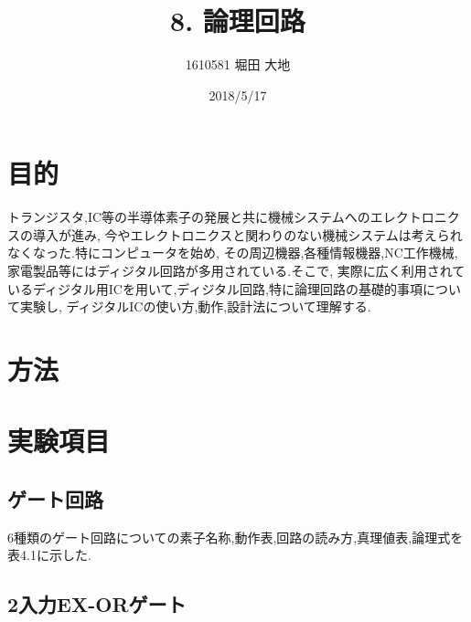 \documentclass[twocolumn, 10pt,a4j]{jsarticle}
\title{\vspace{-2.5cm}8. 論理回路}
\author{1610581 堀田 大地}
\date{2018/5/17}
\begin{document}
\maketitle{}
\section{目的}
トランジスタ,IC等の半導体素子の発展と共に機械システムへのエレクトロニクスの導入が進み,
今やエレクトロニクスと関わりのない機械システムは考えられなくなった.特にコンピュータを始め,
その周辺機器,各種情報機器,NC工作機械, 家電製品等にはディジタル回路が多用されている.そこで,
実際に広く利用されているディジタル用ICを用いて,ディジタル回路,特に論理回路の基礎的事項について実験し,
ディジタルICの使い方,動作,設計法について理解する.
\section{方法}
\section{実験項目}
\subsection{ゲート回路}
6種類のゲート回路についての素子名称,動作表,回路の読み方,真理値表,論理式を表4.1に示した.
\subsection{2入力EX-ORゲート}
\end{document}
